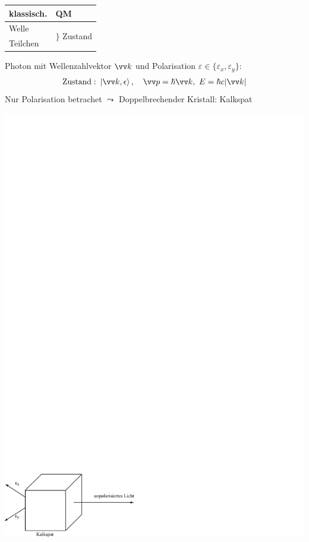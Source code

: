 \documentclass[a4paper]{scrartcl}
\begin{document}
{
\begin{center}
\begin{tabular}{l  l}
klassisch. & QM \\
\hline
Welle & \multirow{2}{*}{ $\Big\}$ Zustand } \\
Teilchen
\end{tabular}
\end{center}
Photon mit Wellenzahlvektor $\vv k$ und Polarisation $\varepsilon \in \{ \varepsilon_x, \varepsilon_y \}$:
\begin{align}
\mathrm{Zustand:} \ \Ket{ \vv k, \epsilon}, \quad \vv p = \hbar \vv k, \ E= \hbar c \vert \vv k \vert
\end{align}
Nur Polarisation betrachet $\leadsto$ Doppelbrechender Kristall: Kalkspat

\begin{center}
\includegraphics{003Kalkspat}
\end{center}
}
\end{document}
